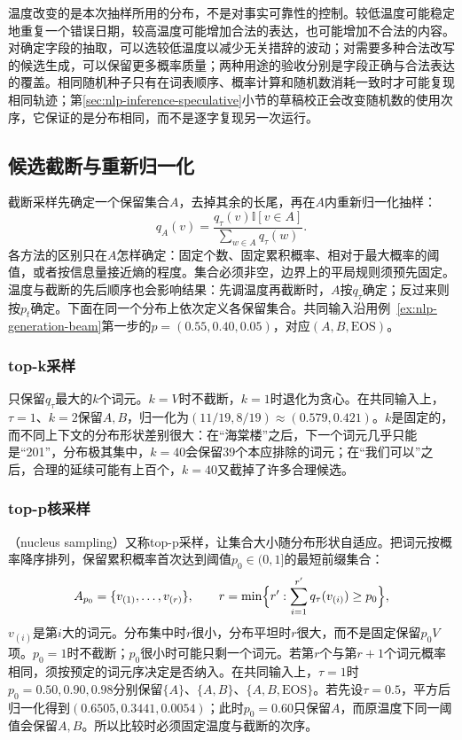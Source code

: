 温度改变的是本次抽样所用的分布，不是对事实可靠性的控制。较低温度可能稳定地重复一个错误日期，较高温度可能增加合法的表达，也可能增加不合法的内容。对确定字段的抽取，可以选较低温度以减少无关措辞的波动；对需要多种合法改写的候选生成，可以保留更多概率质量；两种用途的验收分别是字段正确与合法表达的覆盖。相同随机种子只有在词表顺序、概率计算和随机数消耗一致时才可能复现相同轨迹；第\ref{sec:nlp-inference-speculative}小节的草稿校正会改变随机数的使用次序，它保证的是分布相同，而不是逐字复现另一次运行。

\subsection{候选截断与重新归一化}
\label{sec:nlp-generation-sampling}

截断采样先确定一个保留集合$A$，去掉其余的长尾，再在$A$内重新归一化抽样：
\begin{equation}
 q_A(v)=\frac{q_\tau(v)\mathbb{I}[v\in A]}{\sum_{w\in A}q_\tau(w)}.
 \label{eq:nlp-inference-truncation}
\end{equation}
各方法的区别只在$A$怎样确定：固定个数、固定累积概率、相对于最大概率的阈值，或者按信息量接近熵的程度。集合必须非空，边界上的平局规则须预先固定。温度与截断的先后顺序也会影响结果：先调温度再截断时，$A$按$q_\tau$确定；反过来则按$p_t$确定。下面在同一个分布上依次定义各保留集合。共同输入沿用例~\ref{ex:nlp-generation-beam}第一步的$p=(0.55,0.40,0.05)$，对应$(A,B,\mathrm{EOS})$。

\subsubsection{top-k采样}
\label{sec:nlp-inference-topk}

只保留$q_\tau$最大的$k$个词元。$k=V$时不截断，$k=1$时退化为贪心。在共同输入上，$\tau=1$、$k=2$保留$A,B$，归一化为$(11/19,8/19)\approx(0.579,0.421)$。$k$是固定的，而不同上下文的分布形状差别很大：在“海棠楼”之后，下一个词元几乎只能是“201”，分布极其集中，$k=40$会保留39个本应排除的词元；在“我们可以”之后，合理的延续可能有上百个，$k=40$又截掉了许多合理候选。

\subsubsection{top-p核采样}
\label{sec:nlp-inference-topp}

（nucleus sampling）又称top-p采样，让集合大小随分布形状自适应。把词元按概率降序排列，保留累积概率首次达到阈值$p_0\in(0,1]$的最短前缀集合：
\[
 A_{p_0}=\{v_{(1)},\ldots,v_{(r)}\},\qquad r=\min\Bigl\{r':\sum_{i=1}^{r'}q_\tau(v_{(i)})\geq p_0\Bigr\},
\]
$v_{(i)}$是第$i$大的词元。分布集中时$r$很小，分布平坦时$r$很大，而不是固定保留$p_0V$项。$p_0=1$时不截断；$p_0$很小时可能只剩一个词元。若第$r$个与第$r+1$个词元概率相同，须按预定的词元序决定是否纳入。在共同输入上，$\tau=1$时$p_0=0.50,0.90,0.98$分别保留$\{A\}$、$\{A,B\}$、$\{A,B,\mathrm{EOS}\}$。若先设$\tau=0.5$，平方后归一化得到$(0.6505,0.3441,0.0054)$；此时$p_0=0.60$只保留$A$，而原温度下同一阈值会保留$A,B$。所以比较时必须固定温度与截断的次序。


